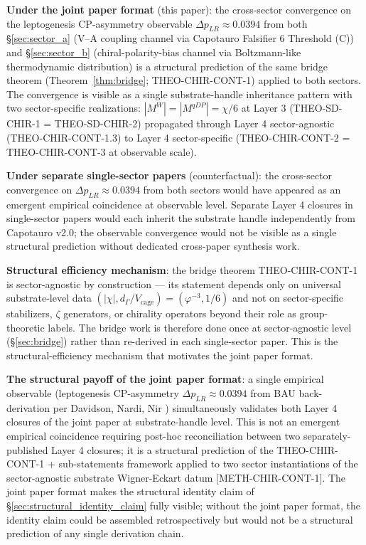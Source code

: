 \documentclass[11pt,letterpaper]{article}
\newcommand{\DeltapLR}{\Delta p_{LR}}
\newcommand{\Vcage}{V_{\text{cage}}}
\newcommand{\dGamma}{d_\Gamma}
\newcommand{\methref}[1]{\textsf{\small[\textsc{#1}]}}
\begin{document}
\textbf{Under the joint paper format} (this paper): the cross-sector convergence on the leptogenesis CP-asymmetry observable $\DeltapLR \approx 0.0394$ from both §\ref{sec:sector_a} (V--A coupling channel via Capotauro Falsifier 6 Threshold (C)) and §\ref{sec:sector_b} (chiral-polarity-bias channel via Boltzmann-like thermodynamic distribution) is a structural prediction of the same bridge theorem (Theorem~\ref{thm:bridge}; THEO-CHIR-CONT-1) applied to both sectors. The convergence is visible as a single substrate-handle inheritance pattern with two sector-specific realizations: $|M^W| = |M^{qDP}| = \chi/6$ at Layer 3 (THEO-SD-CHIR-1 = THEO-SD-CHIR-2) propagated through Layer 4 sector-agnostic (THEO-CHIR-CONT-1.3) to Layer 4 sector-specific (THEO-CHIR-CONT-2 = THEO-CHIR-CONT-3 at observable scale).

\textbf{Under separate single-sector papers} (counterfactual): the cross-sector convergence on $\DeltapLR \approx 0.0394$ from both sectors would have appeared as an emergent empirical coincidence at observable level. Separate Layer 4 closures in single-sector papers would each inherit the substrate handle independently from Capotauro v2.0; the observable convergence would not be visible as a single structural prediction without dedicated cross-paper synthesis work.

\textbf{Structural efficiency mechanism}: the bridge theorem THEO-CHIR-CONT-1 is sector-agnostic by construction --- its statement depends only on universal substrate-level data $(|\chi|, \dGamma/\Vcage) = (\varphi^{-3}, 1/6)$ and not on sector-specific stabilizers, $\zeta$ generators, or chirality operators beyond their role as group-theoretic labels. The bridge work is therefore done once at sector-agnostic level (§\ref{sec:bridge}) rather than re-derived in each single-sector paper. This is the structural-efficiency mechanism that motivates the joint paper format.

\textbf{The structural payoff of the joint paper format}: a single empirical observable (leptogenesis CP-asymmetry $\DeltapLR \approx 0.0394$ from BAU back-derivation per Davidson, Nardi, Nir \cite{DavidsonNardiNir}) simultaneously validates both Layer 4 closures of the joint paper at substrate-handle level. This is not an emergent empirical coincidence requiring post-hoc reconciliation between two separately-published Layer 4 closures; it is a structural prediction of the THEO-CHIR-CONT-1 + sub-statements framework applied to two sector instantiations of the sector-agnostic substrate Wigner-Eckart datum \methref{METH-CHIR-CONT-1}. The joint paper format makes the structural identity claim of §\ref{sec:structural_identity_claim} fully visible; without the joint paper format, the identity claim could be assembled retrospectively but would not be a structural prediction of any single derivation chain.
\end{document}
